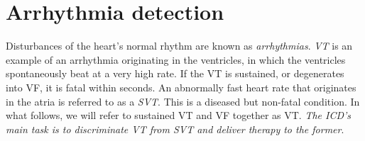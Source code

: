 \section{Arrhythmia detection}
\label{sec:discriminators}
Disturbances of the heart's normal rhythm are known as \emph{arrhythmias}.
\emph{\ac{VT}} is an example of an arrhythmia originating in the ventricles, in which the ventricles spontaneously beat at a very high rate.
If the \ac{VT} is sustained, or degenerates into \ac{VF}, it is fatal within seconds.
An abnormally fast heart rate that originates in the atria is referred to as a \emph{\ac{SVT}}.
This is a diseased but non-fatal condition.
In what follows, we will refer to sustained \ac{VT} and \ac{VF} together as \ac{VT}.
\emph{The ICD's main task is to discriminate \ac{VT} from \ac{SVT} and deliver therapy to the former}.

